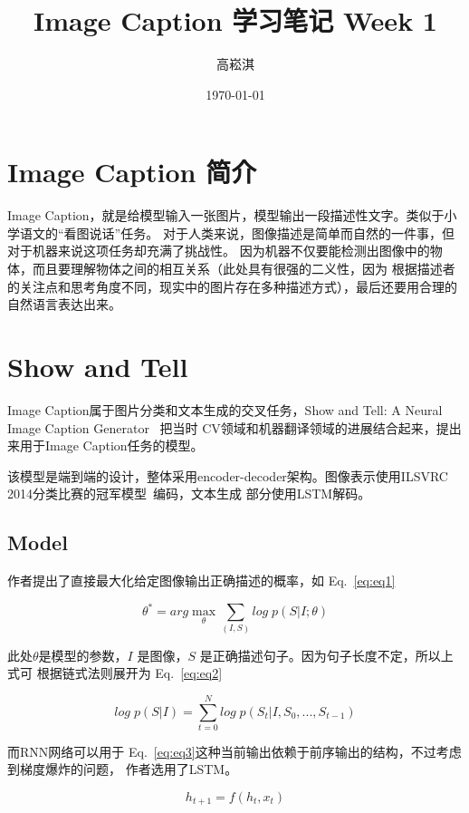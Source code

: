 \documentclass[UTF8]{ctexart}
\title{Image Caption 学习笔记 Week 1}
\author{高崧淇}
\date{\today}
\begin{document}
\maketitle
\tableofcontents

\section{Image Caption 简介}

Image Caption，就是给模型输入一张图片，模型输出一段描述性文字。类似于小学语文的“看图说话”任务。
对于人类来说，图像描述是简单而自然的一件事，但对于机器来说这项任务却充满了挑战性。
因为机器不仅要能检测出图像中的物体，而且要理解物体之间的相互关系（此处具有很强的二义性，因为
根据描述者的关注点和思考角度不同，现实中的图片存在多种描述方式），最后还要用合理的自然语言表达出来。

\section{Show and Tell}
Image Caption属于图片分类和文本生成的交叉任务，Show and Tell: A Neural Image Caption Generator~\cite{show} 把当时
CV领域和机器翻译领域的进展结合起来，提出来用于Image Caption任务的模型。

该模型是端到端的设计，整体采用encoder-decoder架构。图像表示使用ILSVRC 2014分类比赛的冠军模型~\cite{bn}编码，文本生成
部分使用LSTM解码。

\subsection{Model}

作者提出了直接最大化给定图像输出正确描述的概率，如 Eq.~\ref{eq:eq1}

\begin{equation}
    \theta^* = arg \mathop{max}\limits_{\theta} \sum_{(I,S)} log\;p(S|I;\theta )\label{eq:eq1}
\end{equation}

此处$\theta$是模型的参数，$I$ 是图像，$S$ 是正确描述句子。因为句子长度不定，所以上式可
根据链式法则展开为 Eq.~\ref{eq:eq2}

\begin{equation}
    log\;p(S|I) = \sum_{t=0}^{N} log\;p(S_t|I,S_0,...,S_{t-1}) \label{eq:eq2}
\end{equation}

而RNN网络可以用于 Eq.~\ref{eq:eq3}这种当前输出依赖于前序输出的结构，不过考虑到梯度爆炸的问题，
作者选用了LSTM。

\begin{equation}
    h_{t+1}=f(h_t,x_t) \label{eq:eq3}
\end{equation}
\end{document}
